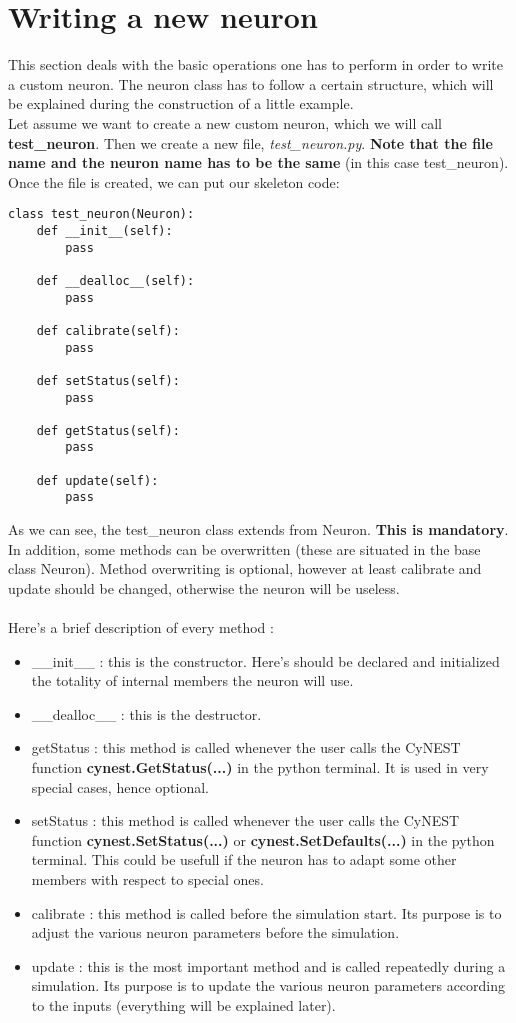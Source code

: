 \documentclass{article}
\begin{document}
\section{Writing a new neuron}
This section deals with the basic operations one has to perform in order to write a custom neuron. The neuron class has to follow a certain structure, which will be explained during the construction of a little example. \\
Let assume we want to create a new custom neuron, which we will call \textbf{test\_neuron}. Then we create a new file, \emph{test\_neuron.py}. \textbf{Note that the file name and the neuron name has to be the same} (in this case test\_neuron). Once the file is created, we can put our skeleton code:
\begin{verbatim}
class test_neuron(Neuron):
    def __init__(self):
        pass
    
    def __dealloc__(self):
        pass

    def calibrate(self):
        pass

    def setStatus(self):
        pass

    def getStatus(self):
        pass

    def update(self):
        pass
\end{verbatim}
As we can see, the test\_neuron class extends from Neuron. \textbf{This is mandatory}. In addition, some methods can be overwritten (these are situated in the base class Neuron). Method overwriting is optional, however at least calibrate and update should be changed, otherwise the neuron will be useless.\\ \\
Here's a brief description of every method :
\begin{itemize}
\item \_\_init\_\_ : this is the constructor. Here's should be declared and initialized the totality of internal members the neuron will use.
\item \_\_dealloc\_\_ : this is the destructor.
\item getStatus : this method is called whenever the user calls the CyNEST function \textbf{ cynest.GetStatus(...)} in the python terminal. It is used in very special cases, hence optional.
\item setStatus : this method is called whenever the user calls the CyNEST function \textbf{ cynest.SetStatus(...)} or \textbf{cynest.SetDefaults(...)} in the python terminal. This could be usefull if the neuron has to adapt some other members with respect to special ones.
\item calibrate : this method is called before the simulation start. Its purpose is to adjust the various neuron parameters before the simulation.
\item update : this is the most important method and is called repeatedly during a simulation. Its purpose is to update the various neuron parameters according to the inputs (everything will be explained later).
\end{itemize}
\end{document}
